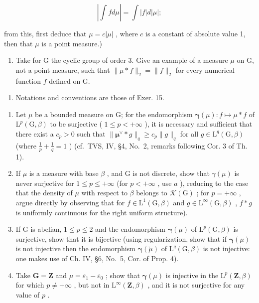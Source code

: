 \[
\left| \int f d \mu \right| = \int | f | d | \mu |;
\]

from this, first deduce that \(\mu = c|\mu|\) , where \(c\) is a constant of absolute value 1, then that \(\mu\) is a point measure.)

\begin{enumerate}
\def\labelenumi{\alph{enumi})}
\setcounter{enumi}{1}
\tightlist
\item
  Take for G the cyclic group of order 3. Give an example of a measure \(\mu\) on G, not a point measure, such that \(\| \mu * f \|_2 = \| f \|_2\) for every numerical function \(f\) defined on G.
\end{enumerate}

\begin{enumerate}
\def\labelenumi{\arabic{enumi})}
\setcounter{enumi}{16}
\tightlist
\item
  Notations and conventions are those of Exer. 15.
\end{enumerate}

\begin{enumerate}
\def\labelenumi{\alph{enumi})}
\item
  Let \(\mu\) be a bounded measure on G; for the endomorphism \(\pmb{\gamma}(\mu): f \mapsto \mu * f\) of \(\mathrm{L}^p(\mathrm{G}, \beta)\) to be surjective ( \(1 \leqslant p < +\infty\) ), it is necessary and sufficient that there exist a \(c_p > 0\) such that \(\| \pmb{\mu}^{\vee} * g \|_q \geqslant c_p \| g \|_q\) for all \(g \in \mathrm{L}^q(\mathrm{G}, \beta)\) (where \(\frac{1}{p} + \frac{1}{q} = 1\) ) (cf.~TVS, IV, §4, No.~2, remarks following Cor. 3 of Th. 1).
\item
  If \(\mu\) is a measure with base \(\beta\) , and G is not discrete, show that \(\gamma(\mu)\) is never surjective for \(1 \leqslant p \leqslant +\infty\) (for \(p < +\infty\) , use \(a\) ), reducing to the case that the density of \(\mu\) with respect to \(\beta\) belongs to \(\mathcal{K}(\mathrm{G})\) ; for \(p = +\infty\) , argue directly by observing that for \(f \in \mathrm{L}^1(\mathrm{G}, \beta)\) and \(g \in \mathrm{L}^\infty(\mathrm{G}, \beta)\) , \(f * g\) is uniformly continuous for the right uniform structure).
\item
  If G is abelian, \(1 \leqslant p \leqslant 2\) and the endomorphism \(\pmb{\gamma}(\mu)\) of \(\mathrm{L}^p(\mathrm{G},\beta)\) is surjective, show that it is bijective (using regularization, show that if \(\pmb{\gamma}(\mu)\) is not injective then the endomorphism \(\pmb{\gamma}(\check{\mu})\) of \(\mathrm{L}^q(\mathrm{G},\beta)\) is not injective: one makes use of Ch. IV, §6, No.~5, Cor. of Prop. 4).
\item
  Take \(\mathbf{G} = \mathbf{Z}\) and \(\mu = \varepsilon_1 - \varepsilon_0\) ; show that \(\pmb{\gamma}(\mu)\) is injective in the \(\mathrm{L}^p (\mathbf{Z},\beta)\) for which \(p\neq +\infty\) , but not in \(\mathrm{L}^{\infty}(\mathbf{Z},\beta)\) , and it is not surjective for any value of \(p\) .
\end{enumerate}

